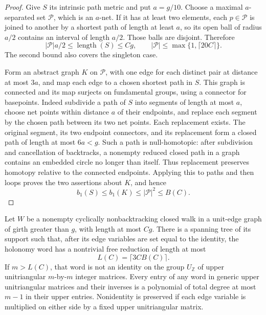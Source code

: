 \begin{proof}
Give \(S\) its intrinsic path metric and put \(a=g/10\).
Choose a maximal \(a\)-separated set \(\mathcal P\), which is an \(a\)-net.
If it has at least two elements, each \(p\in\mathcal P\) is joined to
another by a shortest path of length at least \(a\), so its open ball
of radius \(a/2\) contains an interval of length \(a/2\). Those balls
are disjoint. Therefore
\[
 |\mathcal P|a/2\le \operatorname{length}(S)\le Cg,
 \qquad |\mathcal P|\le\max\{1,\lceil20C\rceil\}.
\]
The second bound also covers the singleton case.

Form an abstract graph \(K\) on \(\mathcal P\), with one edge for each
distinct pair at distance at most \(3a\), and map each edge to a
chosen shortest path in \(S\). This graph is connected and its map
surjects on fundamental groups, using a connector for basepoints.
Indeed subdivide a path of \(S\) into segments of length at most \(a\),
choose net points within distance \(a\) of their endpoints, and replace
each segment by the chosen path between its two net points. Each
replacement exists. The original segment, its two endpoint connectors,
and its replacement form a closed path of length at most \(6a<g\).
Such a path is null-homotopic: after subdivision and cancellation
of backtracks, a nonempty reduced closed path in a graph contains
an embedded circle no longer than itself. Thus replacement preserves
homotopy relative to the connected endpoints. Applying this to paths
and then loops proves the two assertions about \(K\), and hence
\[
 b_1(S)\le b_1(K)\le|\mathcal P|^2\le B(C).
\]
\end{proof}

\begin{lemma}\label{nil:word}
Let \(W\) be a nonempty cyclically nonbacktracking closed walk in a
unit-edge graph of girth greater than \(g\), with length at most \(Cg\).
There is a spanning tree of its support such that, after its edge
variables are set equal to the identity, the holonomy word has a
nontrivial free reduction of length at most
\[
 L(C)=\lceil3CB(C)\rceil.
\]
If \(m>L(C)\), that word is not an identity on the group \(U_{\mathbb Z}\)
of upper unitriangular \(m\)-by-\(m\) integer matrices.
Every entry of any word in generic upper unitriangular matrices and
their inverses is a polynomial of total degree at most \(m-1\) in their
upper entries. Nonidentity is preserved if each edge variable is
multiplied on either side by a fixed upper unitriangular matrix.
\end{lemma}


